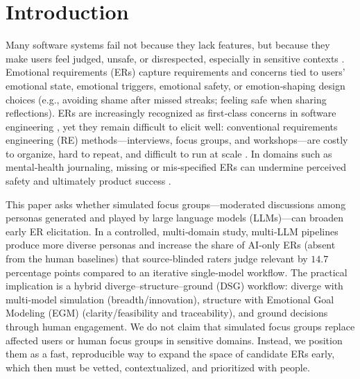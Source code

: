 \documentclass[acmsmall]{acmart}
\begin{document}


\maketitle
\section{Introduction}

Many software systems fail not because they lack features, but because they make users feel judged, unsafe, or disrespected, especially in sensitive contexts \cite{curumsing2014designing}. Emotional requirements (ERs) capture requirements and concerns tied to users’ emotional state, emotional triggers, emotional safety, or emotion‑shaping design choices (e.g., avoiding shame after missed streaks; feeling safe when sharing reflections). ERs are increasingly recognized as first‑class concerns in software engineering \cite{miller2015emotion,alkhomsan2024eliciting}, yet they remain difficult to elicit well: conventional requirements engineering (RE) methods---interviews, focus groups, and workshops---are costly to organize, hard to repeat, and difficult to run at scale \cite{curumsing2014designing,hadiana2020emotional}. In domains such as mental‑health journaling, missing or mis‑specified ERs can undermine perceived safety and ultimately product success \cite{madampe2022emotional}.

This paper asks whether simulated focus groups---moderated discussions among personas generated and played by large language models (LLMs)---can broaden early ER elicitation. In a controlled, multi‑domain study, multi‑LLM pipelines produce more diverse personas and increase the share of AI‑only ERs (absent from the human baselines) that source‑blinded raters judge relevant by \(14.7\) percentage points compared to an iterative single‑model workflow. The practical implication is a hybrid diverge–structure–ground (DSG) workflow: diverge with multi‑model simulation (breadth/innovation), structure with Emotional Goal Modeling (EGM) (clarity/feasibility and traceability), and ground decisions through human engagement. We do not claim that simulated focus groups replace affected users or human focus groups in sensitive domains. Instead, we position them as a fast, reproducible way to expand the space of candidate ERs early, which then must be vetted, contextualized, and prioritized with people.
\end{document}
